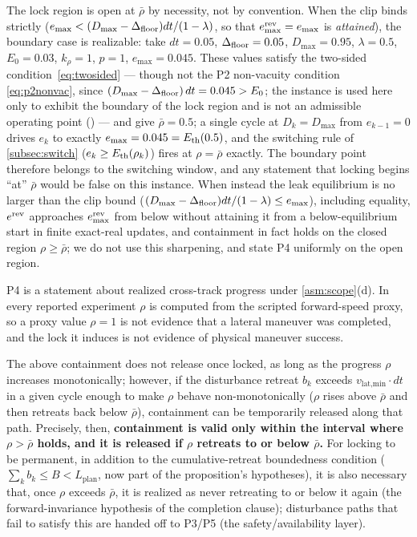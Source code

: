 \begin{remark} \label{rem:lockboundary}
The lock region is open at $\bar\rho$ by necessity, not by convention. When the clip binds strictly ($e_{\max} < (D_{\max}-\Delta_{\text{floor}})dt/(1-\lambda)$, so that $e^{\text{rev}}_{\max} = e_{\max}$ is \emph{attained}), the boundary case is realizable: take $dt = 0.05$, $\Delta_{\text{floor}} = 0.05$, $D_{\max} = 0.95$, $\lambda = 0.5$, $E_0 = 0.03$, $k_\rho = 1$, $p = 1$, $e_{\max} = 0.045$. These values satisfy the two-sided condition~\eqref{eq:twosided} --- though not the P2 non-vacuity condition \eqref{eq:p2nonvac}, since $(D_{\max}-\Delta_{\text{floor}})\,dt = 0.045 > E_0$; the instance is used here only to exhibit the boundary of the lock region and is not an admissible operating point () --- and give $\bar\rho = 0.5$; a single cycle at $D_k = D_{\max}$ from $e_{k-1} = 0$ drives $e_k$ to exactly $e_{\max} = 0.045 = E_{\text{th}}(0.5)$, and the switching rule of \cref{subsec:switch} ($e_k \ge E_{\text{th}}(\rho_k)$) fires at $\rho = \bar\rho$ exactly. The boundary point therefore belongs to the switching window, and any statement that locking begins ``at'' $\bar\rho$ would be false on this instance. When instead the leak equilibrium is no larger than the clip bound ($(D_{\max}-\Delta_{\text{floor}})dt/(1-\lambda) \le e_{\max}$), including equality, $e^{\text{rev}}$ approaches $e^{\text{rev}}_{\max}$ from below without attaining it from a below-equilibrium start in finite exact-real updates, and containment in fact holds on the closed region $\rho \ge \bar\rho$; we do not use this sharpening, and state P4 uniformly on the open region.
\end{remark}

\begin{remark}
P4 is a statement about realized cross-track progress under \cref{asm:scope}(d). In every reported experiment $\rho$ is computed from the scripted forward-speed proxy, so a proxy value $\rho=1$ is not evidence that a lateral maneuver was completed, and the lock it induces is not evidence of physical maneuver success.
\end{remark}

\begin{remark} \label{rem:nonmono}
The above containment does not release once locked, as long as the progress $\rho$ increases monotonically; however, if the disturbance retreat $b_k$ exceeds $v_{\text{lat,min}} \cdot dt$ in a given cycle enough to make $\rho$ behave non-monotonically ($\rho$ rises above $\bar\rho$ and then retreats back below $\bar\rho$), containment can be temporarily released along that path. Precisely, then, \textbf{containment is valid only within the interval where $\rho > \bar\rho$ holds, and it is released if $\rho$ retreats to or below $\bar\rho$.} For locking to be permanent, in addition to the cumulative-retreat boundedness condition ($\sum_k b_k \le B < L_{\text{plan}}$, now part of the proposition's hypotheses), it is also necessary that, once $\rho$ exceeds $\bar\rho$, it is realized as never retreating to or below it again (the forward-invariance hypothesis of the completion clause); disturbance paths that fail to satisfy this are handed off to P3/P5 (the safety/availability layer).
\end{remark}

